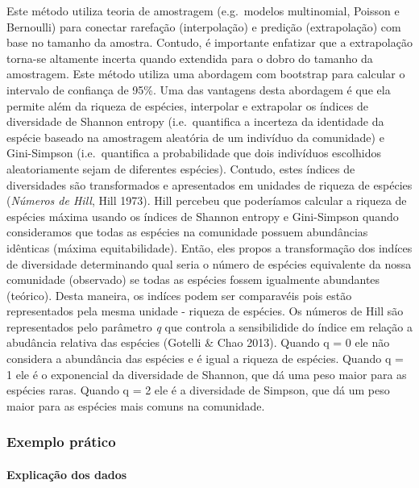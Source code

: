 \documentclass[
]{book}
\begin{document}
Este método utiliza teoria de amostragem (e.g.~modelos multinomial, Poisson e Bernoulli) para conectar rarefação (interpolação) e predição (extrapolação) com base no tamanho da amostra. Contudo, é importante enfatizar que a extrapolação torna-se altamente incerta quando extendida para o dobro do tamanho da amostragem. Este método utiliza uma abordagem com bootstrap para calcular o intervalo de confiança de 95\%. Uma das vantagens desta abordagem é que ela permite além da riqueza de espécies, interpolar e extrapolar os índices de diversidade de Shannon entropy (i.e.~quantifica a incerteza da identidade da espécie baseado na amostragem aleatória de um indivíduo da comunidade) e Gini-Simpson (i.e.~quantifica a probabilidade que dois indivíduos escolhidos aleatoriamente sejam de diferentes espécies). Contudo, estes índices de diversidades são transformados e apresentados em unidades de riqueza de espécies (\emph{Números de Hill}, Hill 1973). Hill percebeu que poderíamos calcular a riqueza de espécies máxima usando os índices de Shannon entropy e Gini-Simpson quando consideramos que todas as espécies na comunidade possuem abundâncias idênticas (máxima equitabilidade). Então, eles propos a transformação dos indíces de diversidade determinando qual seria o número de espécies equivalente da nossa comunidade (observado) se todas as espécies fossem igualmente abundantes (teórico). Desta maneira, os indíces podem ser comparavéis pois estão representados pela mesma unidade - riqueza de espécies. Os números de Hill são representados pelo parâmetro \emph{q} que controla a sensibilidide do índice em relação a abudância relativa das espécies (Gotelli \& Chao 2013). Quando q = 0 ele não considera a abundância das espécies e é igual a riqueza de espécies. Quando q = 1 ele é o exponencial da diversidade de Shannon, que dá uma peso maior para as espécies raras. Quando q = 2 ele é a diversidade de Simpson, que dá um peso maior para as espécies mais comuns na comunidade.

\hypertarget{exemplo-pruxe1tico}{%
\subsubsection{Exemplo prático}\label{exemplo-pruxe1tico}}

\hypertarget{explicauxe7uxe3o-dos-dados-6}{%
\paragraph{Explicação dos dados}\label{explicauxe7uxe3o-dos-dados-6}}
\end{document}
